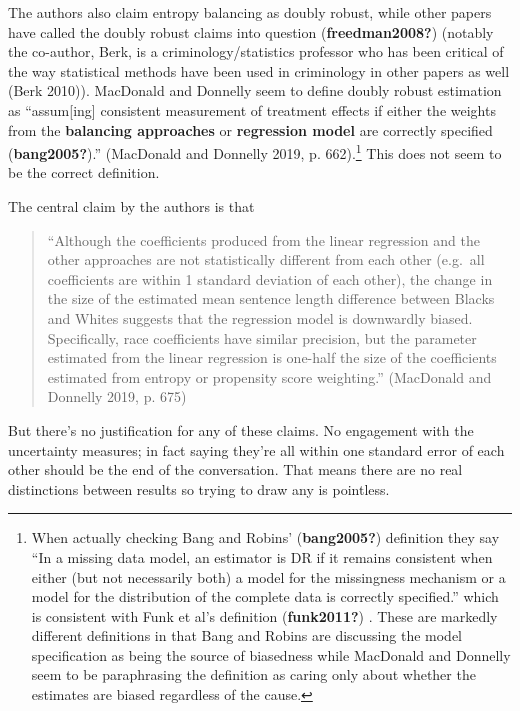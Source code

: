 \documentclass[
  letterpaper,
  DIV=11,
  numbers=noendperiod]{scrartcl}
\begin{document}
The authors also claim entropy balancing as doubly robust, while other
papers have called the doubly robust claims into question
(\textbf{freedman2008?}) (notably the co-author, Berk, is a
criminology/statistics professor who has been critical of the way
statistical methods have been used in criminology in other papers as
well (Berk 2010)). MacDonald and Donnelly seem to define doubly robust
estimation as ``assum{[}ing{]} consistent measurement of treatment
effects if either the weights from the \textbf{balancing approaches} or
\textbf{regression model} are correctly specified
(\textbf{bang2005?}).'' (MacDonald and Donnelly 2019, p.
662).\footnote{When actually checking Bang and Robins'
  (\textbf{bang2005?}) definition they say ``In a missing data model, an
  estimator is DR if it remains consistent when either (but not
  necessarily both) a model for the missingness mechanism or a model for
  the distribution of the complete data is correctly specified.'' which
  is consistent with Funk et al's definition (\textbf{funk2011?}) .
  These are markedly different definitions in that Bang and Robins are
  discussing the model specification as being the source of biasedness
  while MacDonald and Donnelly seem to be paraphrasing the definition as
  caring only about whether the estimates are biased regardless of the
  cause.} This does not seem to be the correct definition.

The central claim by the authors is that

\begin{quote}
``Although the coefficients produced from the linear regression and the
other approaches are not statistically different from each other
(e.g.~all coefficients are within 1 standard deviation of each other),
the change in the size of the estimated mean sentence length difference
between Blacks and Whites suggests that the regression model is
downwardly biased. Specifically, race coefficients have similar
precision, but the parameter estimated from the linear regression is
one-half the size of the coefficients estimated from entropy or
propensity score weighting.'' (MacDonald and Donnelly 2019, p. 675)
\end{quote}

But there's no justification for any of these claims. No engagement with
the uncertainty measures; in fact saying they're all within one standard
error of each other should be the end of the conversation. That means
there are no real distinctions between results so trying to draw any is
pointless.
\end{document}
